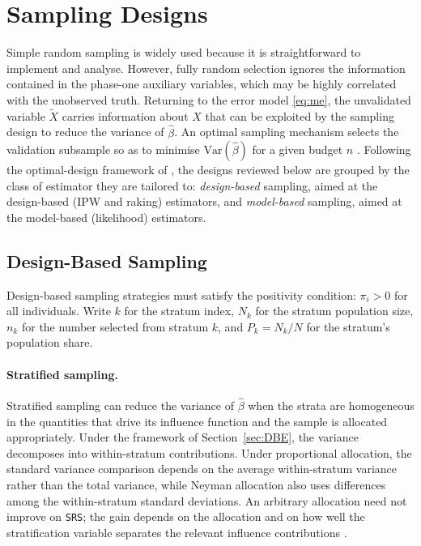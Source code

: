 \section{Sampling Designs}
\label{sec:sampling}

Simple random sampling is widely used because it is straightforward to implement and analyse. However, fully random selection ignores the information contained in the phase-one auxiliary variables, which may be highly correlated with the unobserved truth. Returning to the error model \eqref{eq:me}, the unvalidated variable $\tilde{X}$ carries information about $X$ that can be exploited by the sampling design to reduce the variance of $\hat{\beta}$. An optimal sampling mechanism selects the validation subsample so as to minimise $\mathrm{Var}(\hat{\beta})$ for a given budget $n$ \citep{amorim2021two}. Following the optimal-design framework of \citet{amorim2021two}, the designs reviewed below are grouped by the class of estimator they are tailored to: \emph{design-based} sampling, aimed at the design-based (IPW and raking) estimators, and \emph{model-based} sampling, aimed at the model-based (likelihood) estimators.

\subsection{Design-Based Sampling}
\label{sec:design_sampling}

Design-based sampling strategies must satisfy the positivity condition: $\pi_i > 0$ for all individuals. Write $k$ for the stratum index, $N_k$ for the stratum population size, $n_k$ for the number selected from stratum $k$, and $P_k=N_k/N$ for the stratum's population share.

\paragraph{Stratified sampling.}
Stratified sampling can reduce the variance of $\hat{\beta}$ when the strata are homogeneous in the quantities that drive its influence function and the sample is allocated appropriately. Under the framework of Section~\ref{sec:DBE}, the variance decomposes into within-stratum contributions. Under proportional allocation, the standard variance comparison depends on the average within-stratum variance rather than the total variance, while Neyman allocation also uses differences among the within-stratum standard deviations. An arbitrary allocation need not improve on \texttt{SRS}; the gain depends on the allocation and on how well the stratification variable separates the relevant influence contributions \citep{cochran1977, sarndal1992model, lumley2011complex}.


